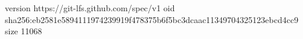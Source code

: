 version https://git-lfs.github.com/spec/v1
oid sha256:eb2581e5894111974239919f478375b6f5bc3dcaac11349704325123ebcd4cc9
size 11068

